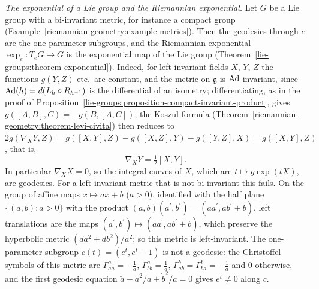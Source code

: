 \begin{example}\label{riemannian-geometry:example-lie-exponential}
\emph{The exponential of a Lie group and the Riemannian exponential.} Let $G$ be a Lie group with a bi-invariant metric, for instance a compact group
(Example~\ref{riemannian-geometry:example-metrics}). Then the geodesics through $e$ are the one-parameter subgroups, and the Riemannian exponential $\exp_e \colon T_eG \to G$ is the exponential map of the
Lie group (Theorem~\ref{lie-groups:theorem-exponential}). Indeed, for left-invariant fields $X$, $Y$, $Z$ the functions $g(Y, Z)$ etc.\ are constant, and the metric on $\mathfrak{g}$ is $\operatorname{Ad}$-invariant, since $\operatorname{Ad}(h) = d(L_h \circ R_{h^{-1}})$ is the differential of an isometry; differentiating, as in the proof of
Proposition~\ref{lie-groups:proposition-compact-invariant-product}, gives $g([A, B], C) = -g(B, [A, C])$; the Koszul formula (Theorem~\ref{riemannian-geometry:theorem-levi-civita}) then reduces to
$2g(\nabla_XY, Z) = g([X, Y], Z) - g([X, Z], Y) - g([Y, Z], X) = g([X, Y], Z)$, that is,
\[
\nabla_XY = \tfrac12[X, Y].
\]
In particular $\nabla_XX = 0$, so the integral curves of $X$, which are $t \mapsto g\exp(tX)$, are geodesics. For a left-invariant metric that is not bi-invariant this fails. On the group of affine maps
$x \mapsto ax + b$ ($a > 0$), identified with the half plane $\{(a, b) : a > 0\}$ with the product $(a, b)(a^{\prime}, b^{\prime}) = (aa^{\prime}, ab^{\prime} + b)$, left translations are the maps
$(a^{\prime}, b^{\prime}) \mapsto (aa^{\prime}, ab^{\prime} + b)$, which preserve the hyperbolic metric $(da^2 + db^2)/a^2$; so this metric is left-invariant. The one-parameter subgroup $c(t) = (e^t, e^t - 1)$ is
not a geodesic: the Christoffel symbols of this metric are $\Gamma^a_{aa} = -\frac1a$, $\Gamma^a_{bb} = \frac1a$, $\Gamma^b_{ab} = \Gamma^b_{ba} = -\frac1a$ and $0$ otherwise, and the first geodesic equation
$\ddot a - \dot a^2/a + \dot b^2/a = 0$ gives $e^t \neq 0$ along $c$.
\end{example}

